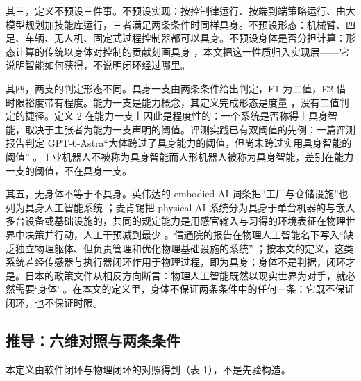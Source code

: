 \documentclass[10pt,fontset=fandol]{ctexart}
\begin{document}
其三，定义不预设三件事。不预设实现：按控制律运行、按端到端策略运行、由大模型规划加技能库运行，三者满足两条条件时同样具身。不预设形态：机械臂、四足、车辆、无人机、固定式过程控制器都可以具身。不预设身体是否分担计算：形态计算的传统以身体对控制的贡献刻画具身 \cite{pfeifer2006,muller2017,liu2025csur}，本文把这一性质归入实现层——它说明智能如何获得，不说明闭环经过哪里。

其四，两支的判定形态不同。具身一支由两条条件给出判定，E1 为二值，E2 借时限裕度带有程度。能力一支是能力概念，其定义完成形态是度量 \cite{yu2026four}，没有二值判定的捷径。定义 2 在能力一支上因此是程度性的：一个系统是否称得上具身智能，取决于主张者为能力一支声明的阈值。评测实践已有双阈值的先例：一篇评测报告判定 GPT-6-Astra“大体跨过了具身能力的阈值，但尚未跨过实用具身智能的阈值” \cite{gptastra2026}。工业机器人不被称为具身智能而人形机器人被称为具身智能，差别在能力一支的阈值，不在具身一支。

其五，无身体不等于不具身。英伟达的 embodied AI 词条把“工厂与仓储设施”也列为具身人工智能系统 \cite{nvglossary}；麦肯锡把 physical AI 系统分为具身于单台机器的与嵌入多台设备或基础设施的，共同的规定能力是用感官输入与习得的环境表征在物理世界中决策并行动，人工干预减到最少 \cite{mckinsey2026}。信通院的报告在物理人工智能名下写入“缺乏独立物理躯体、但负责管理和优化物理基础设施的系统” \cite{caict2026}；按本文的定义，这类系统若经传感器与执行器闭环作用于物理过程，即为具身；身体不是判据，闭环才是。日本的政策文件从相反方向断言：物理人工智能既然以现实世界为对手，就必然需要‘身体’ \cite{japanrobo2026}。在本文的定义里，身体不保证两条条件中的任何一条：它既不保证闭环，也不保证时限。

\subsection{推导：六维对照与两条条件}

本定义由软件闭环与物理闭环的对照得到（表 1），不是先验构造。
\end{document}
